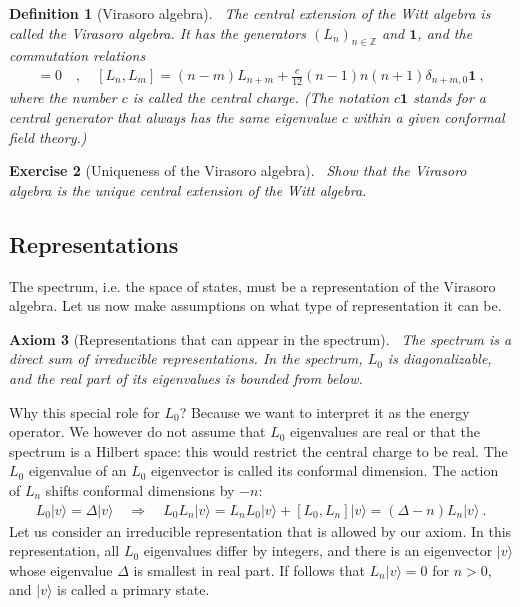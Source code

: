 \documentclass[12pt, a4paper]{article}
\theoremstyle{break}
\newtheorem{exo}{Exercise}[section]
\newtheorem{hyp}[exo]{Axiom}
\newtheorem{defn}[exo]{Definition}
\begin{document}
\begin{defn}[Virasoro algebra]
 ~\label{def:vir}
 The central extension of the Witt algebra is called the Virasoro algebra. It has the generators $(L_n)_{n\in\mathbb{Z}}$ and $\mathbf 1$, and the commutation relations
 \begin{align}
  [\mathbf 1, L_n] = 0 \quad , \quad [L_n,L_m] = (n-m)L_{n+m} +\frac{c}{12}(n-1)n(n+1)\delta_{n+m,0}\mathbf 1 \ ,
  \label{eq:vir}
 \end{align}
 where the number $c$ is called the central charge. (The notation $c\mathbf 1$ stands for a central generator that always has the same eigenvalue $c$ within a given conformal field theory.)
\end{defn}

\begin{tcolorbox}
\begin{exo}[Uniqueness of the Virasoro algebra]
 ~\label{exo:vir}
 Show that the Virasoro algebra is the unique central extension of the Witt algebra.
\end{exo}
\end{tcolorbox}


\subsection{Representations}

The spectrum, i.e. the space of states, must be a representation of the Virasoro algebra. Let us now make assumptions on what type of representation it can be.

\begin{hyp}[Representations that can appear in the spectrum]
 ~\label{hyp:rep}
 The spectrum is a direct sum of irreducible representations. In the spectrum, $L_0$ is diagonalizable, and the real part of its eigenvalues is bounded from below.
\end{hyp}
Why this special role for $L_0$? Because we want to interpret it as the energy operator. 
We however do not assume that $L_0$ eigenvalues are real or that the spectrum is a Hilbert space: this would restrict the central charge to be real. The $L_0$ eigenvalue of an $L_0$ eigenvector is called its conformal dimension. The action of $L_n$ shifts conformal dimensions by $-n$:
\begin{align}
 L_0|v\rangle = \Delta|v\rangle \quad \Rightarrow\quad  L_0 L_n|v\rangle = L_nL_0|v\rangle + [L_0, L_n] |v\rangle  = (\Delta-n)L_n|v\rangle \ .
\end{align}
Let us consider an irreducible representation that is allowed by our axiom. In this representation, all $L_0$ eigenvalues differ by integers, and there is an eigenvector $|v\rangle$ whose eigenvalue $\Delta$ is smallest in real part. 
If follows that $L_n|v\rangle =0$ for $n>0$, and $|v\rangle $ is called a primary state.
\end{document}
